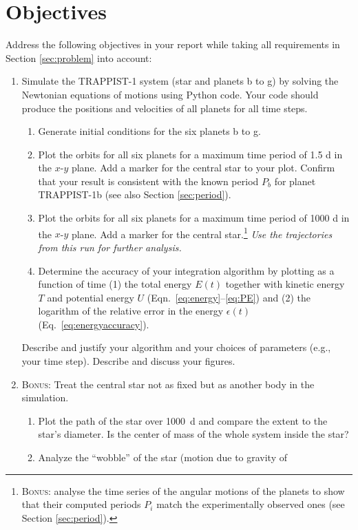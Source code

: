 \documentclass[letterpaper]{scrartcl}
\newcommand{\BONUS}{\textsc{Bonus: }}
\newenvironment{enuma}{\begin{enumerate}[label=(\alph*)]}{\end{enumerate}}
\newenvironment{enumi}{\begin{enumerate}[label=(\roman*)]}{\end{enumerate}}
\begin{document}
\section{Objectives}
\label{sec:tasks}
Address the following objectives in your report while taking all
requirements in Section \ref{sec:problem} into account:
\begin{enuma}
\item Simulate the TRAPPIST-1 system (star and planets b to g) by
  solving the Newtonian equations of motions using Python code. Your
  code should produce the positions and velocities of all planets for
  all time steps.
  \begin{enumi}
  \item Generate initial conditions for the six planets b to g.
  \item Plot the orbits for all six planets for a maximum time period
    of 1.5 d in the $x$-$y$ plane. Add a marker for the central star
    to your plot. Confirm that your result is consistent with the
    known period $P_{b}$ for planet TRAPPIST-1b (see also Section
    \ref{sec:period}).
  \item Plot the orbits for all six planets for a maximum time period
    of 1000 d in the $x$-$y$ plane. Add a marker for the central
    star.\footnote{\BONUS analyse the time series of the angular
      motions of the planets to show that their computed periods
      $P_{i}$ match the experimentally observed ones (see Section
      \protect\ref{sec:period}).} \emph{Use the trajectories from this
      run for further analysis.}
  \item Determine the accuracy of your integration algorithm by
    plotting as a function of time (1) the total energy $E(t)$
    together with kinetic energy $T$ and potential energy $U$
    (Eqn.~\ref{eq:energy}--\ref{eq:PE}) and (2) the logarithm of the
    relative error in the energy $\epsilon(t)$
    (Eq.~\ref{eq:energyaccuracy}).
  \end{enumi}
  Describe and justify your algorithm and your choices of parameters (e.g., your
  time step). Describe and discuss your figures.
\item \BONUS Treat the central star not as fixed but as another body
  in the simulation. 
  \begin{enumi}
  \item Plot the path of the star over 1000~d and compare the extent
    to the star's diameter. Is the center of mass of the whole system
    inside the star?
  \item Analyze the ``wobble'' of the star (motion due to gravity of

\end{enumi}
\end{enuma}
\end{document}
